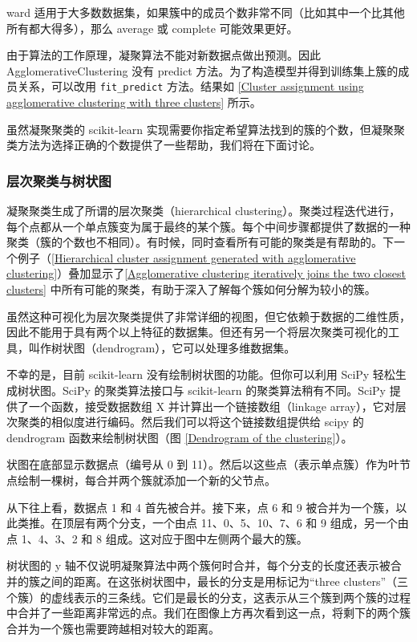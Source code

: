 ward 适用于大多数数据集，如果簇中的成员个数非常不同（比如其中一个比其他所有都大得多），那么 average 或 complete 可能效果更好。

由于算法的工作原理，凝聚算法不能对新数据点做出预测。因此 AgglomerativeClustering 没有 predict 方法。为了构造模型并得到训练集上簇的成员关系，可以改用 \verb|fit_predict| 方法。结果如 \autoref{Cluster assignment using agglomerative clustering with three clusters} 所示。


虽然凝聚聚类的 scikit-learn 实现需要你指定希望算法找到的簇的个数，但凝聚聚类方法为选择正确的个数提供了一些帮助，我们将在下面讨论。
\subsubsection{层次聚类与树状图}
凝聚聚类生成了所谓的层次聚类（hierarchical clustering）。聚类过程迭代进行，每个点都从一个单点簇变为属于最终的某个簇。每个中间步骤都提供了数据的一种聚类（簇的个数也不相同）。有时候，同时查看所有可能的聚类是有帮助的。下一个例子（\autoref{Hierarchical cluster assignment generated with agglomerative clustering}）叠加显示了\autoref{Agglomerative clustering iteratively joins the two closest clusters} 中所有可能的聚类，有助于深入了解每个簇如何分解为较小的簇。


虽然这种可视化为层次聚类提供了非常详细的视图，但它依赖于数据的二维性质，因此不能用于具有两个以上特征的数据集。但还有另一个将层次聚类可视化的工具，叫作树状图（dendrogram），它可以处理多维数据集。

不幸的是，目前 scikit-learn 没有绘制树状图的功能。但你可以利用 SciPy 轻松生成树状图。SciPy 的聚类算法接口与 scikit-learn 的聚类算法稍有不同。SciPy 提供了一个函数，接受数据数组 X 并计算出一个链接数组（linkage array），它对层次聚类的相似度进行编码。然后我们可以将这个链接数组提供给 scipy 的 dendrogram 函数来绘制树状图（图 \autoref{Dendrogram of the clustering}）。

状图在底部显示数据点（编号从 0 到 11）。然后以这些点（表示单点簇）作为叶节点绘制一棵树，每合并两个簇就添加一个新的父节点。

从下往上看，数据点 1 和 4 首先被合并。接下来，点 6 和 9 被合并为一个簇，以此类推。在顶层有两个分支，一个由点 11、0、5、10、7、6 和 9 组成，另一个由点 1、4、3、2 和 8 组成。这对应于图中左侧两个最大的簇。

树状图的 y 轴不仅说明凝聚算法中两个簇何时合并，每个分支的长度还表示被合并的簇之间的距离。在这张树状图中，最长的分支是用标记为“three clusters”（三个簇）的虚线表示的三条线。它们是最长的分支，这表示从三个簇到两个簇的过程中合并了一些距离非常远的点。我们在图像上方再次看到这一点，将剩下的两个簇合并为一个簇也需要跨越相对较大的距离。

